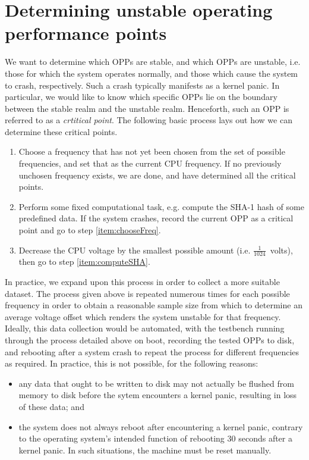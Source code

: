 \section{Determining unstable operating performance points}
\label{sec:unstableOPPs}

We want to determine which OPPs are stable, and which OPPs are unstable, i.e.
those for which the system operates normally, and those which cause the system
to crash, respectively. Such a crash typically manifests as a kernel panic.
In particular, we would like to know which specific OPPs lie on the boundary
between the stable realm and the unstable realm. Henceforth, such an OPP is
referred to as a \emph{crtitical point}. The following basic process lays out
how we can determine these critical points.

\begin{enumerate}
    \item \label{item:chooseFreq} Choose a frequency that has not yet been
        chosen from the set of possible frequencies, and set that as the current
        CPU frequency. If no previously unchosen frequency exists, we are done,
        and have determined all the critical points.
    \item \label{item:computeSHA} Perform some fixed computational task, e.g.
        compute the SHA-1 hash of some predefined data. If the system crashes,
        record the current OPP as a critical point and go to step
        \ref{item:chooseFreq}.
    \item \label{item:undervolt} Decrease the CPU voltage by the smallest
        possible amount (i.e. $\frac{1}{1024}$~volts), then go to step
        \ref{item:computeSHA}.
\end{enumerate}

In practice, we expand upon this process in order to collect a more suitable
dataset. The process given above is repeated numerous times for each possible
frequency in order to obtain a reasonable sample size from which to determine
an average voltage offset which renders the system unstable for that frequency.
Ideally, this data collection would be automated, with the testbench running
through the process detailed above on boot, recording the tested OPPs to disk,
and rebooting after a system crash to repeat the process for different
frequencies as required. In practice, this is not possible, for the following
reasons:

\begin{itemize}
    \item any data that ought to be written to disk may not actually be flushed
        from memory to disk before the sytem encounters a kernel panic, 
        resulting in loss of these data; and
    \item the system does not always reboot after encountering a kernel panic,
        contrary to the operating system's intended function of rebooting 30
        seconds after a kernel panic. In such situations, the machine must be
        reset manually.
\end{itemize}

